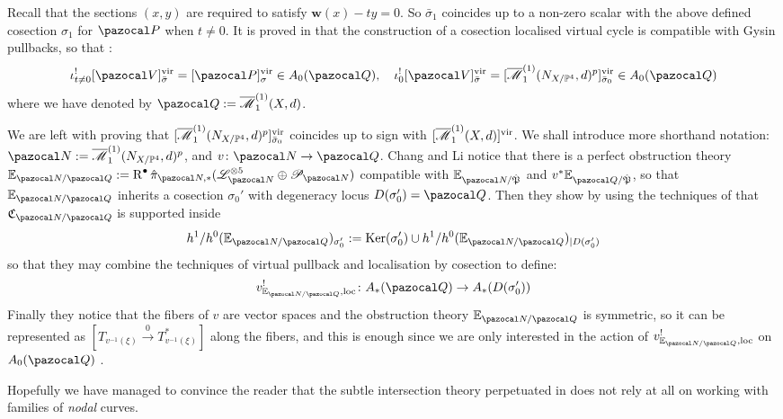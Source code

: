 \documentclass[11pt]{amsart}
\newcommand{\Mone}[3]{\overline{\mathcal M}^{(1)}_{#1}(#2,#3)}
\newcommand{\PP}{\mathbb P}
\renewcommand{\to}{\rightarrow}
\newcommand{\hP}{\hat{\mathfrak P}}
\newcommand{\R}{\operatorname{R}}
\newcommand{\w}{\mathbf{w}}
\theoremstyle{plain}
\theoremstyle{definition}
\begin{document}
Recall that the sections $(x,y)$ are required to satisfy $\w(x)-ty=0$. So $\bar\sigma_1$ coincides up to a non-zero scalar with the above defined cosection $\sigma_1$ for $\pazocal P$ when $t\neq 0$. It is proved in \cite[Theorem 5.2]{KLcosection} that the construction of a cosection localised virtual cycle is compatible with Gysin pullbacks, so that \cite[Proposition 4.9]{CLpfields}:
\[
 \iota_{t\neq0}^![\pazocal V]^{\rm{vir}}_{\rm{\bar\sigma}}=[\pazocal P]^{\rm{vir}}_{\rm{\sigma}}\in A_0(\pazocal Q),\quad \iota_{0}^![\pazocal V]^{\rm{vir}}_{\rm{\bar\sigma}}=[\Mone{1}{N_{X/\PP^4}}{d}^p]^{\rm{vir}}_{\rm{\bar\sigma_0}}\in A_0(\pazocal Q)
\]
where we have denoted by $\pazocal Q:=\Mone{1}{X}{d}$.

We are left with proving that $[\Mone{1}{N_{X/\PP^4}}{d}^p]^{\rm{vir}}_{\rm{\bar\sigma_0}}$ coincides up to sign with $[\Mone{1}{X}{d}]^{\rm{vir}}$. We shall introduce more shorthand notation: $\pazocal N:=\Mone{1}{N_{X/\PP^4}}{d}^p$, and $v\colon\pazocal N\to\pazocal Q$. Chang and Li notice that there is a perfect obstruction theory $\mathbb E_{\pazocal N/\pazocal Q}:=\R^{\bullet}\hat\pi_{\pazocal N,*}(\mathcal L^{\otimes 5}_{\pazocal N}\oplus \mathcal P_{\pazocal N})$ compatible with $\mathbb E_{\pazocal N/\hP}$ and $v^*\mathbb E_{\pazocal Q/\hP}$, so that $\mathbb E_{\pazocal N/\pazocal Q}$ inherits a cosection $\sigma_0'$ with degeneracy locus $D(\sigma_0')=\pazocal Q$. Then \cite[Lemma 5.5]{CLpfields} they show by using the techniques of \cite{KKP} that $\mathfrak C_{\pazocal N/\pazocal Q}$ is supported inside 
\[
 h^1/h^0(\mathbb E_{\pazocal N/\pazocal Q})_{\sigma_0'}:=\operatorname{Ker}(\sigma_0')\cup  h^1/h^0(\mathbb E_{\pazocal N/\pazocal Q})_{|D(\sigma_0')}
\]
so that they may combine the techniques of virtual pullback \cite{Manolache-pullback} and localisation by cosection \cite{KLcosection} to define:
\[
 v^!_{\mathbb E_{\pazocal N/\pazocal Q},\rm{loc}}\colon A_*(\pazocal Q)\to A_*(D(\sigma_0'))
\]
Finally they notice that the fibers of $v$ are vector spaces and the obstruction theory $\mathbb E_{\pazocal N/\pazocal Q}$ is symmetric, so it can be represented as $[T_{v^{-1}(\xi)}\xrightarrow{0}T^*_{v^{-1}(\xi)}]$ along the fibers, and this is enough since we are only interested in the action of $v^!_{\mathbb E_{\pazocal N/\pazocal Q},\rm{loc}}$ on $A_0(\pazocal Q)$ \cite[Theorem 5.7]{CLpfields}.

Hopefully we have managed to convince the reader that the subtle intersection theory perpetuated in \cite{CLpfields} does not rely at all on working with families of \emph{nodal} curves.
\end{document}
